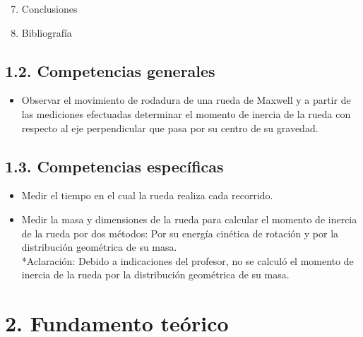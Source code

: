 \documentclass[10pt]{article}
\begin{document}
\begin{enumerate}
  \setcounter{enumi}{6}
  \item Conclusiones
  \item Bibliografía
\end{enumerate}

\subsection*{1.2. Competencias generales}
\begin{itemize}
  \item Observar el movimiento de rodadura de una rueda de Maxwell y a partir de las mediciones efectuadas determinar el momento de inercia de la rueda con respecto al eje perpendicular que pasa por su centro de su gravedad.
\end{itemize}

\subsection*{1.3. Competencias específicas}
\begin{itemize}
  \item Medir el tiempo en el cual la rueda realiza cada recorrido.
  \item Medir la masa y dimensiones de la rueda para calcular el momento de inercia de la rueda por dos métodos: Por su energía cinética de rotación y por la distribución geométrica de su masa.\\
*Aclaración: Debido a indicaciones del profesor, no se calculó el momento de inercia de la rueda por la distribución geométrica de su masa.
\end{itemize}

\section*{2. Fundamento teórico}
\end{document}
